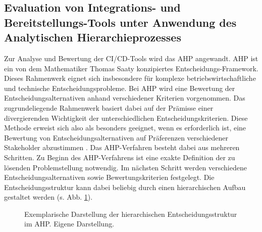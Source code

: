 \subsection{Evaluation von Integrations- und Bereitstellungs-Tools unter Anwendung des Analytischen Hierarchieprozesses}
\label{sec:meth_ahp}
Zur Analyse und Bewertung der CI/CD-Tools wird das AHP angewandt. 
AHP ist ein von dem Mathematiker Thomas Saaty konzipiertes Entscheidungs-Framework. Dieses Rahmenwerk eignet sich insbesondere für komplexe betriebswirtschaftliche und technische Entscheidungsprobleme. Bei AHP wird eine Bewertung der Entscheidungsalternativen anhand verschiedener Kriterien vorgenommen. Das zugrundeliegende Rahmenwerk basiert dabei auf der Prämisse einer divergierenden Wichtigkeit der unterschiedlichen Entscheidungskriterien. Diese Methode erweist sich also als besonders geeignet, wenn es erforderlich ist, eine Bewertung von Entscheidungsalternativen auf Präferenzen verschiedener Stakeholder abzustimmen \cite[86]{Saaty.2008}. Das AHP-Verfahren besteht dabei aus mehreren Schritten. Zu Beginn des AHP-Verfahrens ist eine exakte Definition der zu lösenden Problemstellung notwendig. Im nächsten Schritt werden verschiedene Entscheidungsalternativen sowie Bewertungskriterien festgelegt. Die Entscheidungsstruktur kann dabei beliebig durch einen hierarchischen Aufbau gestaltet werden (s. Abb. \ref{fig:AHP_B}). 
\begin{center}
	\begin{figure}[H]
		\centering
		\caption[Exemplarische Darstellung der hierarchischen Entscheidungsstruktur im AHP]{Exemplarische Darstellung der hierarchischen Entscheidungsstruktur im AHP. Eigene Darstellung.}
		\label{fig:AHP_B}
	\end{figure}
\end{center}
\vspace*{-10mm}

